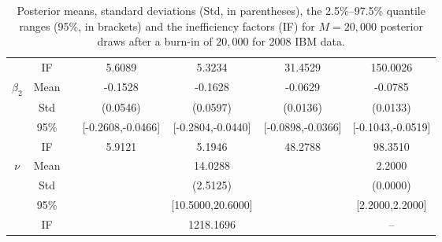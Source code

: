 \begin{table}
\begin{footnotesize}
\begin{singlespace}
\begin{tabular}{ccc cccc }
 & IF  &  &  5.6089  &  5.3234  &  31.4529  &  150.0026  \\ [1.0ex] 
 $\beta_2$   & Mean   &  &  -0.1528  &  -0.1628  &  -0.0629  &  -0.0785  \\  
 & Std   &  &  (0.0546)  &  (0.0597)  &  (0.0136)  &  (0.0133)  \\  
 & 95\%  &  &  [-0.2608,-0.0466]  &  [-0.2804,-0.0440]  &  [-0.0898,-0.0366]  &  [-0.1043,-0.0519]  \\  
 & IF  &  &  5.9121  &  5.1946  &  48.2788  &  98.3510  \\ [1.0ex] 
 $\nu$   & Mean   &  &&  14.0288  &&  2.2000  \\  
 & Std   & & &  (2.5125) & &  (0.0000)  \\  
 & 95\%  &  &&  [10.5000,20.6000]  &&  [2.2000,2.2000]  \\  
 & IF  &  &&  1218.1696  &&  --  \\ [1.0ex] 
\bottomrule 
\end{tabular}
 \end{singlespace}
 \end{footnotesize}
 \caption{Posterior means, standard deviations (Std, in parentheses), 
 the 2.5\%--97.5\% quantile ranges (95\%, in brackets) and  the inefficiency factors (IF)  for $M=20,000$ posterior draws after a burn-in of $20,000$ 
for 2008 IBM data.}
\label{tab:sim_res_2008_IBM} 
\end{table}
